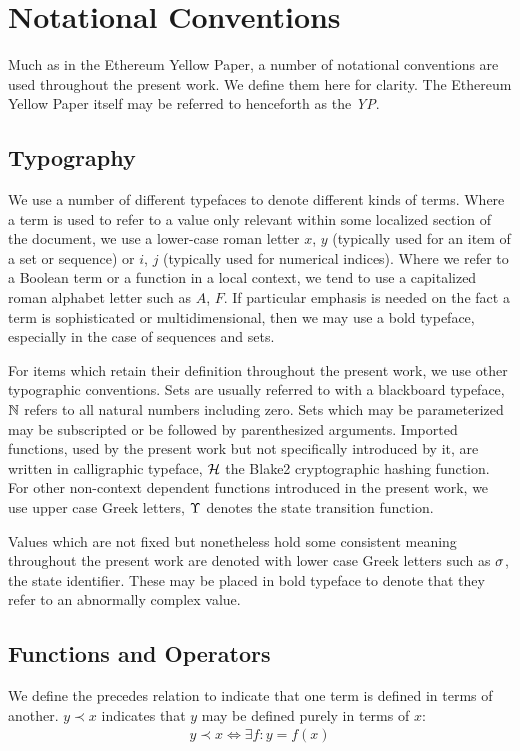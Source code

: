 \section{Notational Conventions}
\label{sec:notation}

Much as in the Ethereum Yellow Paper, a number of notational conventions are used throughout the present work. We define them here for clarity. The Ethereum Yellow Paper itself may be referred to henceforth as the \emph{YP}.

\subsection{Typography}\label{sec:typography}

We use a number of different typefaces to denote different kinds of terms. Where a term is used to refer to a value only relevant within some localized section of the document, we use a lower-case roman letter \eg $x$, $y$ (typically used for an item of a set or sequence) or \eg $i$, $j$ (typically used for numerical indices). Where we refer to a Boolean term or a function in a local context, we tend to use a capitalized roman alphabet letter such as $A$, $F$. If particular emphasis is needed on the fact a term is sophisticated or multidimensional, then we may use a bold typeface, especially in the case of sequences and sets.

For items which retain their definition throughout the present work, we use other typographic conventions. Sets are usually referred to with a blackboard typeface, \eg $\mathbb{N}$ refers to all natural numbers including zero. Sets which may be parameterized may be subscripted or be followed by parenthesized arguments. Imported functions, used by the present work but not specifically introduced by it, are written in calligraphic typeface, \eg $\mathcal{H}$ the Blake2 cryptographic hashing function. For other non-context dependent functions introduced in the present work, we use upper case Greek letters, \eg $\Upsilon$ denotes the state transition function.

Values which are not fixed but nonetheless hold some consistent meaning throughout the present work are denoted with lower case Greek letters such as $\sigma$, the state identifier. These may be placed in bold typeface to denote that they refer to an abnormally complex value.

\subsection{Functions and Operators}\label{sec:functions}
We define the precedes relation to indicate that one term is defined in terms of another. \Eg $y \prec x$ indicates that $y$ may be defined purely in terms of $x$:
\begin{align}\label{eq:precedes}
  y \prec x \Longleftrightarrow \exists f: y = f(x)
\end{align}

